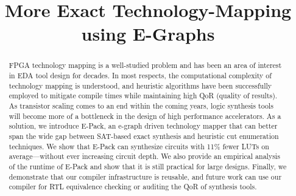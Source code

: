 \documentclass[sigplan,nonacm]{acmart}
\newcommand{\fullname}{More Exact Technology-Mapping using E-Graphs}
\newcommand{\metric}{11\% fewer LUTs}
\begin{document}
\title{\fullname}

\begin{abstract}
    FPGA technology mapping is a well-studied problem and has been an area of
    interest in EDA tool design for decades. In most respects, the computational
    complexity of technology mapping is understood, and heuristic algorithms have
    been successfully employed to mitigate compile times while maintaining high QoR
    (quality of results). As transistor scaling comes to an end within the coming
    years, logic synthesis tools will become more of a bottleneck in the design of
    high performance accelerators. As a solution, we introduce E-Pack, an e-graph
    driven technology mapper that can better span the wide gap between SAT-based
    exact synthesis and heuristic cut enumeration techniques. We show that E-Pack
    can synthesize circuits with \metric{} on average---without ever
    increasing circuit depth. We also provide an empirical analysis of the runtime
    of E-Pack and show that it is still practical for large designs. Finally, we
    demonstrate that our compiler infrastructure is reusable, and future work can
    use our compiler for RTL equivalence checking or auditing the QoR of synthesis
    tools.
\end{abstract}
\maketitle %












\end{document}

